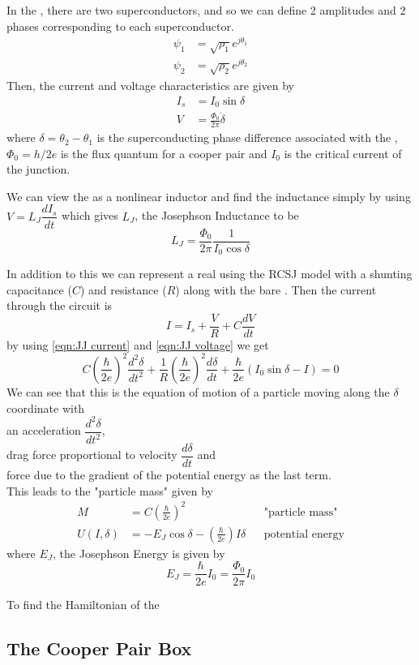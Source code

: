 In the \JJ, there are two superconductors, and so we can define 2 amplitudes and 2 phases corresponding to each superconductor.
\begin{align*}
\psi_1&=\sqrt{\rho_1}e^{j\theta_1}\\
\psi_2&=\sqrt{\rho_2}e^{j\theta_2}
\end{align*}
Then, the current and voltage characteristics are given by \cite{Harmans1997}
\begin{align}
I_s&=I_0\sin\delta
\label{eqn:JJ current}\\
V&=\frac{\Phi_0}{2\pi}\dot{\delta}
\label{eqn:JJ voltage}
\end{align}
where $\delta=\theta_2-\theta_1$ is the superconducting phase difference associated with the \JJ, $\Phi_0=h/2e$ is the flux quantum for a cooper pair and $I_0$ is the critical current of the junction.

We can view the \JJ as a nonlinear inductor and find the inductance simply by using $V=L_J\dfrac{dI_s}{dt}$ which gives $L_J$, the Josephson Inductance to be
\begin{equation}
L_J=\frac{\Phi_0}{2\pi}\frac{1}{I_0\cos\delta}
\end{equation}

In addition to this we can represent a real \JJ using the RCSJ model with a shunting capacitance ($C$) and resistance ($R$) along with the bare \JJ \cite{Harmans1997}. Then the current through the circuit is
\begin{equation}
I=I_s+\frac{V}{R}+C\frac{dV}{dt}
\end{equation}
by using \ref{eqn:JJ current} and \ref{eqn:JJ voltage} we get
\begin{equation}
C\left(\frac{\hbar}{2e}\right)^2\frac{d^2\delta}{dt^2}+\frac{1}{R}\left(\frac{\hbar}{2e}\right)^2\frac{d\delta}{dt}+\frac{\hbar}{2e}(I_0\sin\delta-I)=0
\end{equation}
We can see that this is the equation of motion of a particle moving along the $\delta$ coordinate with\\ an acceleration $\dfrac{d^2\delta}{dt^2}$,\\ drag force proportional to velocity $\dfrac{d\delta}{dt}$ and\\ force due to the gradient of the potential energy as the last term.\\
This leads to the "particle mass" given by
\begin{align*}
M&=C\left(\frac{\hbar}{2e}\right)^2&&\text{"particle mass"}\\
U(I,\delta)&=-E_J\cos\delta-\left(\frac{\hbar}{2e}\right)I\delta&&\text{potential energy}
\end{align*}
where $E_J$, the Josephson Energy is given by
\begin{equation}
E_J=\frac{\hbar}{2e}I_0=\frac{\Phi_0}{2\pi}I_0
\end{equation}

To find the Hamiltonian of the \JJ

\subsection{The Cooper Pair Box}

